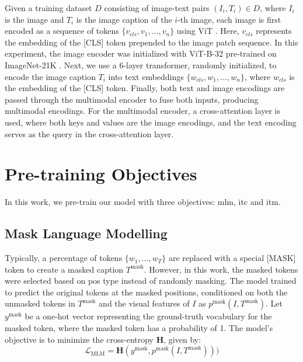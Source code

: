 Given a training dataset \(D\) consisting of image-text pairs \((I_i, T_i) \in D\), where \(I_i\) is the image and \(T_i\) is the image caption of the \(i\)-th image, each image is first encoded as a sequence of tokens \(\{v_{cls}, v_1, \dots, v_n\}\) using ViT \cite{vit}.  
Here, \(v_{cls}\) represents the embedding of the [CLS] token prepended to the image patch sequence.  
In this experiment, the image encoder was initialized with ViT-B-32 pre-trained on ImageNet-21K \cite{imagenet}.  
Next, we use a 6-layer transformer, randomly initialized, to encode the image caption \(T_i\) into text embeddings \(\{w_{cls}, w_1, \dots, w_n\}\), where \(w_{cls}\) is the embedding of the [CLS] token.  
Finally, both text and image encodings are passed through the multimodal encoder to fuse both inputs, producing multimodal encodings.  
For the multimodal encoder, a cross-attention layer is used, where both keys and values are the image encodings, and the text encoding serves as the query in the cross-attention layer.  


\section{Pre-training Objectives}
In this work, we pre-train our model with three objectives: \acrfull{mlm}, \acrfull{itc} and \acrfull{itm}.
\subsection{Mask Language Modelling}
Typically, a percentage of tokens \(\{w_1, \dots, w_T\}\) are replaced with a special [MASK] token to create a masked caption \(T^{\text{mask}}\).  
However, in this work, the masked tokens were selected based on \acrshort{pos} type instead of randomly masking.  
The model trained to predict the original tokens at the masked positions, conditioned on both the unmasked tokens in \(T^{\text{mask}}\) and the visual features of \(I\) as \(p^{\text{mask}}(I, T^{\text{mask}})\).  
Let \(y^{\text{mask}}\) be a one-hot vector representing the ground-truth vocabulary for the masked token, where the masked token has a probability of 1.  
The model’s objective is to minimize the cross-entropy \(\mathbf{H}\), given by:  
\[
    \mathcal{L}_{\text{MLM}} = \mathbf{H}(y^{\text{mask}}, p^{\text{mask}}(I, T^{\text{mask}})))
\]


